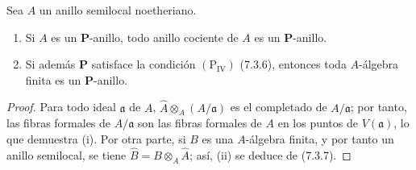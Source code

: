 \begin{proposition}[7.3.15]
\label{IV.2.s7.3.15-fr}
Sea $A$ un anillo semilocal noetheriano.
\begin{enumerate}
\item[\textup{(i)}] Si $A$ es un $\boldsymbol P$-anillo, todo anillo
cociente de $A$ es un $\boldsymbol P$-anillo.
\item[\textup{(ii)}] Si además $\boldsymbol P$ satisface la condición
$(\mathrm P_{\mathrm{IV}})$ \textup{(7.3.6)}, entonces toda $A$-álgebra finita
es un $\boldsymbol P$-anillo.
\end{enumerate}
\end{proposition}

\begin{proof}
Para todo ideal $\mathfrak a$ de $A$,
$\widehat A\otimes_A(A/\mathfrak a)$ es el completado de
$A/\mathfrak a$; por tanto, las fibras formales de $A/\mathfrak a$
son las fibras formales de $A$ en los puntos de $V(\mathfrak a)$, lo
que demuestra (i). Por otra parte, si $B$ es una $A$-álgebra finita,
y por tanto un anillo semilocal, se tiene
$\widehat B=B\otimes_A\widehat A$; así, (ii) se deduce de (7.3.7).
\end{proof}
